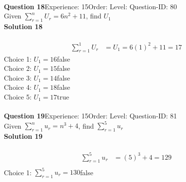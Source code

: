 \documentclass{article}
\begin{document}
\\[4pt]
\noindent\textbf{Question 18}\hspace{20pt}Experience: 15\hspace{20pt}Order: \hspace{20pt}Level: \hspace{20pt}Question-ID: 80\\[2pt]
Given $\displaystyle\sum_{r=1}^{n} U_r = 6n^2+11$, find $U_1$\\[4pt]
\noindent\textbf{Solution 18}\\[2pt]
\\[-35pt]\begin{align*}
\displaystyle\sum_{r=1}^{1} U_r &=U_1=6(1)^2+11=17
\end{align*}
Choice 1: \hspace{20pt}$U_1=16$\hspace{20pt}false\\
Choice 2: \hspace{20pt}$U_1=15$\hspace{20pt}false\\
Choice 3: \hspace{20pt}$U_1=14$\hspace{20pt}false\\
Choice 4: \hspace{20pt}$U_1=18$\hspace{20pt}false\\
Choice 5: \hspace{20pt}$U_1=17$\hspace{20pt}true\\
\\[4pt]
\noindent\textbf{Question 19}\hspace{20pt}Experience: 15\hspace{20pt}Order: \hspace{20pt}Level: \hspace{20pt}Question-ID: 81\\[2pt]
Given $\displaystyle\sum_{r=1}^{n} u_r = n^3+4$, find $\displaystyle\sum_{r=1}^{5} u_r$\\[4pt]
\noindent\textbf{Solution 19}\\[2pt]
\\[-35pt]\begin{align*}
\displaystyle\sum_{r=1}^{5} u_r &= (5)^3+4=129\\[2pt]
\end{align*}
Choice 1: \hspace{20pt}$\displaystyle\sum_{r=1}^{5} u_r=130$\hspace{20pt}false\\
\end{document}
